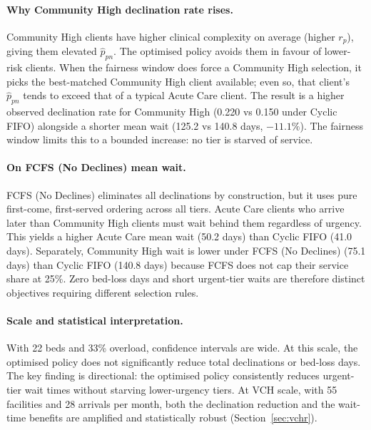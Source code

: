 \paragraph{Why Community High declination rate rises.}
Community High clients have higher clinical complexity on average (higher $r_p$),
giving them elevated $\hat{p}_{pn}$. The optimised policy avoids them in favour
of lower-risk clients. When the fairness window does force a Community High
selection, it picks the best-matched Community High client available; even so,
that client's $\hat{p}_{pn}$ tends to exceed that of a typical Acute Care client.
The result is a higher observed declination rate for Community High (0.220 vs
0.150 under Cyclic FIFO) alongside a shorter mean wait (125.2 vs 140.8 days,
$-11.1\%$). The fairness window limits this to a bounded increase: no tier is
starved of service.

\paragraph{On FCFS (No Declines) mean wait.}
FCFS (No Declines) eliminates all declinations by construction, but it uses pure
first-come, first-served ordering across all tiers. Acute Care clients who arrive
later than Community High clients must wait behind them regardless of urgency.
This yields a higher Acute Care mean wait (50.2 days) than Cyclic FIFO (41.0
days). Separately, Community High wait is lower under FCFS (No Declines) (75.1
days) than Cyclic FIFO (140.8 days) because FCFS does not cap their service
share at 25\%. Zero bed-loss days and short urgent-tier waits are therefore
distinct objectives requiring different selection rules.

\paragraph{Scale and statistical interpretation.}
With 22 beds and 33\% overload, confidence intervals are wide. At this scale,
the optimised policy does not significantly reduce total declinations or
bed-loss days. The key finding is directional: the optimised policy consistently
reduces urgent-tier wait times without starving lower-urgency tiers. At VCH
scale, with 55 facilities and 28 arrivals per month, both the declination
reduction and the wait-time benefits are amplified and statistically robust
(Section~\ref{sec:vchr}).
